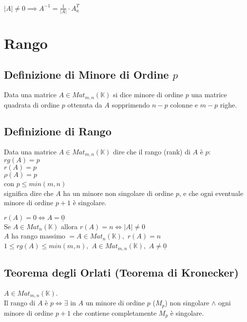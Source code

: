 \documentclass[a4paper, twoside, italian, 11pt]{book}
\newcommand{\detm}[1] {\left | #1 \right |}
\newcommand{\K}{\mathbb K}
\begin{document}
\noindent
$\detm A \neq 0 \implies A^{-1} = \frac{1}{\detm A} \cdot A_a^T$



\section{Rango}



\subsection{Definizione di Minore di Ordine $p$}

Data una matrice $A \in Mat_{m,n}(\K)$ si dice minore di ordine $p$ una matrice quadrata di ordine $p$ ottenuta da $A$ sopprimendo $n-p$ colonne e $m-p$ righe.


\subsection{Definizione di Rango}

Data una matrice $A \in Mat_{m,n}(\K)$ dire che il rango (rank) di $A$ è $p$: \\

\noindent
$rg(A) = p$ \\
$r(A) = p$ \\
$\rho(A) = p$ \\

\noindent
con $p \leq min(m, n)$ \\

\noindent
significa dire che $A$ ha un minore non singolare di ordine $p$, e che ogni eventuale minore di ordine $p + 1$ è singolare.

\noindent
$r(A) = 0 \iff A = \underline{0}$ \\

\noindent
Se $A \in Mat_n(\K)$ allora $r(A) = n \iff \detm A \neq 0$ \\

\noindent
$A$ ha rango massimo $= A \in Mat_n(\K),$ $r(A) = n$ \\

\noindent
$1 \leq rg(A) \leq min(m,n),$ $A \in Mat_{m,n}(\K),$ $A \neq \underline{0}$


\subsection{Teorema degli Orlati (Teorema di Kronecker)}

$A \in Mat_{m,n}(\K)$.\\
Il rango di $A$ è $p \iff \exists$ in $A$ un minore di ordine $p$ ($M_p$) non singolare $\land$ ogni minore di ordine $p + 1$ che contiene completamente $M_p$ è singolare.
\end{document}
